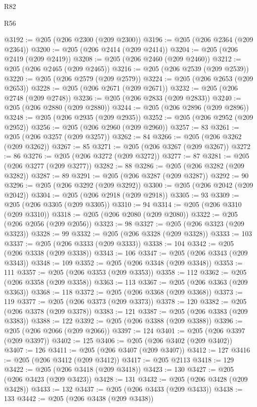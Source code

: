 \begin{lexlean}{R82}
\begin{lexlean}{R56}
\begin{coremodule}
{{{{{{{{{{{{{{{{{{{{{{{{{{{{{{{{{{{{{{{{{{{{{{{{{{{{{{{{{{{{{{{{{{{{{{{{{{{{{{{{{{{{{{{{{{{{{{{{{{{{{{{{{{{{{{{{{{{{{{{{{{{{{{{{{{{{{{{{{{{{{{{{{{{{{{{{{{{{{{{{{{{{{{{{{{{{{{{{{{{{{{{{{{{{{{{{{{{{{{{{{{{{{{{{{{{@3192 := @205 (@206 @2300 (@209 @2300))
@3196 := @205 (@206 @2364 (@209 @2364))
@3200 := @205 (@206 @2414 (@209 @2414))
@3204 := @205 (@206 @2419 (@209 @2419))
@3208 := @205 (@206 @2460 (@209 @2460))
@3212 := @205 (@206 @2465 (@209 @2465))
@3216 := @205 (@206 @2539 (@209 @2539))
@3220 := @205 (@206 @2579 (@209 @2579))
@3224 := @205 (@206 @2653 (@209 @2653))
@3228 := @205 (@206 @2671 (@209 @2671))
@3232 := @205 (@206 @2748 (@209 @2748))
@3236 := @205 (@206 @2833 (@209 @2833))
@3240 := @205 (@206 @2880 (@209 @2880))
@3244 := @205 (@206 @2896 (@209 @2896))
@3248 := @205 (@206 @2935 (@209 @2935))
@3252 := @205 (@206 @2952 (@209 @2952))
@3256 := @205 (@206 @2960 (@209 @2960))
@3257 := 83
@3261 := @205 (@206 @3257 (@209 @3257))
@3262 := 84
@3266 := @205 (@206 @3262 (@209 @3262))
@3267 := 85
@3271 := @205 (@206 @3267 (@209 @3267))
@3272 := 86
@3276 := @205 (@206 @3272 (@209 @3272))
@3277 := 87
@3281 := @205 (@206 @3277 (@209 @3277))
@3282 := 88
@3286 := @205 (@206 @3282 (@209 @3282))
@3287 := 89
@3291 := @205 (@206 @3287 (@209 @3287))
@3292 := 90
@3296 := @205 (@206 @3292 (@209 @3292))
@3300 := @205 (@206 @2042 (@209 @2042))
@3304 := @205 (@206 @2918 (@209 @2918))
@3305 := 93
@3309 := @205 (@206 @3305 (@209 @3305))
@3310 := 94
@3314 := @205 (@206 @3310 (@209 @3310))
@3318 := @205 (@206 @2080 (@209 @2080))
@3322 := @205 (@206 @2056 (@209 @2056))
@3323 := 98
@3327 := @205 (@206 @3323 (@209 @3323))
@3328 := 99
@3332 := @205 (@206 @3328 (@209 @3328))
@3333 := 103
@3337 := @205 (@206 @3333 (@209 @3333))
@3338 := 104
@3342 := @205 (@206 @3338 (@209 @3338))
@3343 := 106
@3347 := @205 (@206 @3343 (@209 @3343))
@3348 := 109
@3352 := @205 (@206 @3348 (@209 @3348))
@3353 := 111
@3357 := @205 (@206 @3353 (@209 @3353))
@3358 := 112
@3362 := @205 (@206 @3358 (@209 @3358))
@3363 := 113
@3367 := @205 (@206 @3363 (@209 @3363))
@3368 := 118
@3372 := @205 (@206 @3368 (@209 @3368))
@3373 := 119
@3377 := @205 (@206 @3373 (@209 @3373))
@3378 := 120
@3382 := @205 (@206 @3378 (@209 @3378))
@3383 := 121
@3387 := @205 (@206 @3383 (@209 @3383))
@3388 := 122
@3392 := @205 (@206 @3388 (@209 @3388))
@3396 := @205 (@206 @2066 (@209 @2066))
@3397 := 124
@3401 := @205 (@206 @3397 (@209 @3397))
@3402 := 125
@3406 := @205 (@206 @3402 (@209 @3402))
@3407 := 126
@3411 := @205 (@206 @3407 (@209 @3407))
@3412 := 127
@3416 := @205 (@206 @3412 (@209 @3412))
@3417 := @205 @2113
@3418 := 129
@3422 := @205 (@206 @3418 (@209 @3418))
@3423 := 130
@3427 := @205 (@206 @3423 (@209 @3423))
@3428 := 131
@3432 := @205 (@206 @3428 (@209 @3428))
@3433 := 132
@3437 := @205 (@206 @3433 (@209 @3433))
@3438 := 133
@3442 := @205 (@206 @3438 (@209 @3438))
}}}}}}}}}}}}}}}}}}}}}}}}}}}}}}}}}}}}}}}}}}}}}}}}}}}}}}}}}}}}}}}}}}}}}}}}}}}}}}}}}}}}}}}}}}}}}}}}}}}}}}}}}}}}}}}}}}}}}}}}}}}}}}}}}}}}}}}}}}}}}}}}}}}}}}}}}}}}}}}}}}}}}}}}}}}}}}}}}}}}}}}}}}}}}}}}}}}}}}}}}}}}}}}}}}}
\end{coremodule}
\end{lexlean}
\end{lexlean}

